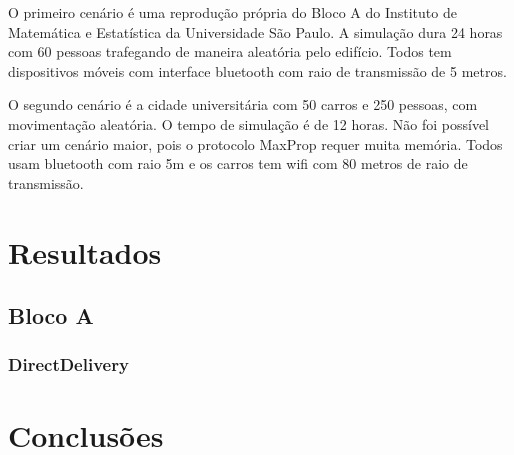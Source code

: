 \documentclass[conference]{IEEEtran}
\begin{document}
  O primeiro cenário é uma reprodução própria do Bloco A do Instituto de Matemática e Estatística da Universidade São Paulo. A simulação
dura 24 horas com 60 pessoas trafegando de maneira aleatória pelo edifício. Todos tem dispositivos móveis com interface bluetooth com raio de
transmissão de 5 metros.

  O segundo cenário é a cidade universitária com 50 carros e 250 pessoas, com movimentação aleatória. O tempo de simulação é de 12 horas.
Não foi possível criar um cenário maior, pois o protocolo MaxProp requer muita memória. Todos usam bluetooth com raio 5m e os carros tem wifi
com 80 metros de raio de transmissão.

\section{Resultados}

\subsection*{Bloco A}

\subsubsection*{DirectDelivery} 

\section{Conclusões}
\end{document}
